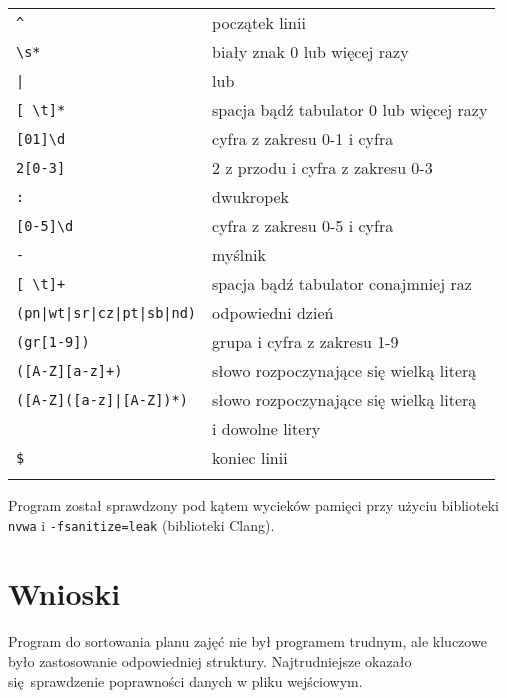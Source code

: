 \documentclass[12pt,a4paper,oneside]{article}
\let\oldmarginpar\marginpar
\renewcommand\marginpar[1]{%
  {\linespread{0.85}\normalfont\scriptsize%
\oldmarginpar[\hspace{1cm}\begin{minipage}{3cm}\raggedleft\scriptsize\color{black}\textsf{#1}\end{minipage}]%
{\hspace{0cm}\begin{minipage}{3cm}\raggedright\scriptsize\color{black}\textsf{#1}\end{minipage}}%
}%
}
\begin{document}
\begin{tabular}{ll}
	\toprule
	\verb/^/                      & początek linii    \\
	\verb/\s*/ 			& biały znak 0 lub więcej razy            \\
	\verb/|/             		& lub         \\
	\verb/[ \t]*/             	& spacja bądź tabulator 0 lub więcej razy         \\
	\verb/[01]\d/               & cyfra z zakresu 0-1 i cyfra  \\
	\verb/2[0-3]/               & 2 z przodu i cyfra z zakresu 0-3            \\
	\verb/:/            		& dwukropek                    \\
	\verb/[0-5]\d/             & cyfra z zakresu 0-5 i cyfra                     \\
	\verb/-/ 			& myślnik \\
	\verb/[ \t]+/		& spacja bądź tabulator conajmniej raz	\\
	\verb/(pn|wt|sr|cz|pt|sb|nd)/         & odpowiedni dzień \\
	\verb/(gr[1-9])/                     	& grupa i cyfra z zakresu 1-9                    \\
	\verb/([A-Z][a-z]+)/ 	& słowo rozpoczynające się wielką literą             \\
	\verb/([A-Z]([a-z]|[A-Z])*)/ 		& słowo rozpoczynające się wielką literą \\
						&i dowolne litery	\\
	\verb/$/ 			& koniec linii            \\
	\bottomrule
	                            &
\end{tabular}

Program został sprawdzony pod kątem wycieków pamięci przy użyciu biblioteki \texttt{nvwa} i \texttt{-fsanitize=leak} (biblioteki Clang).

%



\section{Wnioski}
\marginpar{}
Program do sortowania planu zajęć nie był programem trudnym, ale kluczowe było zastosowanie odpowiedniej struktury. Najtrudniejsze okazało się sprawdzenie poprawności danych w pliku wejściowym. 
\end{document}

